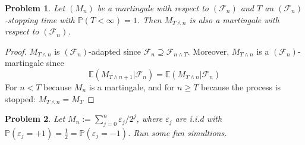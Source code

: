 \documentclass[aps,prl,twocolumn,floatfix,letterpaper]{revtex4}
\newtheorem{problem}{Problem}
\newcommand{\PP}{\mathbb{P}}
\newcommand{\EE}{\mathbb{E}}
\newcommand{\FF}{\mathcal{F}}
\begin{document}
\begin{problem}
Let $(M_n)$ be a martingale with respect to $(\FF_n)$ and $T$ an $(\FF_n)$-stopping time with
$\PP(T<\infty) = 1$. Then $M_{T\wedge n}$ is also a martingale with respect to $(\FF_n)$.
\end{problem}
\begin{proof}
$M_{T\wedge n}$ is $(\FF_n)$-adapted since 
$\FF_n \supseteq \FF_{n\wedge T}$.
Moreover, $M_{T \wedge n}$ is a $(\FF_n)$-martingale since
$$
\EE(M_{T \wedge n+1}|\FF_n) = \EE(M_{T\wedge n}|\FF_n)
$$
For	$n < T$	 because $M_n$  is a martingale, and 
	for $n \geq T$ because the process is stopped: $M_{T\wedge n} = M_{T}$
\end{proof}

\begin{problem}
Let $M_n := \sum_{j=0}^n \varepsilon_j/2^j$, where $\varepsilon_j$ are i.i.d with 
$\PP(\varepsilon_j = +1 ) = \frac{1}{2} = \PP(\varepsilon_j=-1)$. Run some fun simultions.
\end{problem}
\end{document}
